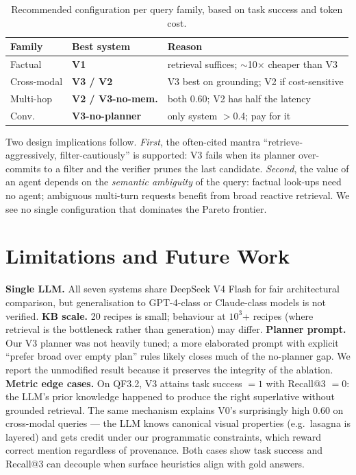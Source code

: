 \documentclass[sigconf, nonacm=true, anonymous=false]{acmart}
\begin{document}
\begin{table}[H]
\centering\small
\caption{Recommended configuration per query family, based on
task success and token cost.}
\label{tab:guide}
\begin{tabular}{@{}ll>{\raggedright\arraybackslash}p{3.1cm}@{}}
\toprule
Family & Best system & Reason \\
\midrule
Factual        & \textbf{V1}              & retrieval suffices; $\sim$10$\times$ cheaper than V3 \\
Cross-modal    & \textbf{V3 / V2}         & V3 best on grounding; V2 if cost-sensitive \\
Multi-hop      & \textbf{V2 / V3-no-mem.} & both 0.60; V2 has half the latency \\
Conv.          & \textbf{V3-no-planner}   & only system $>$0.4; pay for it \\
\bottomrule
\end{tabular}
\end{table}
\FloatBarrier

Two design implications follow. \emph{First}, the often-cited mantra
``retrieve-aggressively, filter-cautiously'' is supported: V3 fails
when its planner over-commits to a filter and the verifier prunes the
last candidate. \emph{Second}, the value of an agent depends on the
\emph{semantic ambiguity} of the query: factual look-ups need no
agent; ambiguous multi-turn requests benefit from broad reactive
retrieval. We see no single configuration that dominates the
Pareto frontier.

\section{Limitations and Future Work}
\label{sec:limits}

\textbf{Single LLM.} All seven systems share DeepSeek V4 Flash for
fair architectural comparison, but generalisation to GPT-4-class or
Claude-class models is not verified.
\textbf{KB scale.} 20 recipes is small; behaviour at $10^3$+ recipes
(where retrieval is the bottleneck rather than generation) may differ.
\textbf{Planner prompt.} Our V3 planner was not heavily tuned; a more
elaborated prompt with explicit ``prefer broad over empty plan'' rules
likely closes much of the no-planner gap. We report the unmodified
result because it preserves the integrity of the ablation.
\textbf{Metric edge cases.} On QF3.2, V3 attains task success $=1$ with
Recall@3 $=0$: the LLM's prior knowledge happened to produce the right
superlative without grounded retrieval. The same mechanism explains
V0's surprisingly high 0.60 on cross-modal queries --- the LLM knows
canonical visual properties (e.g.\ lasagna is layered) and gets credit
under our programmatic constraints, which reward correct mention
regardless of provenance. Both cases show task success and Recall@3
can decouple when surface heuristics align with gold answers.
\end{document}
